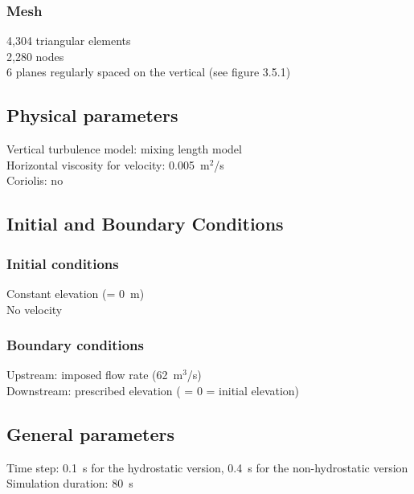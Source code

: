 \subsubsection{Mesh}
%
4,304 triangular elements\\
2,280 nodes\\
6 planes regularly spaced on the vertical (see figure 3.5.1)
%
%
%
\subsection{Physical parameters}
%
Vertical turbulence model: mixing length model\\
Horizontal viscosity for velocity: 0.005~m$^2$/s\\
Coriolis: no
%
%
%
%
%
%
\subsection{Initial and Boundary Conditions}
%
\subsubsection{Initial conditions}
%
Constant elevation (= 0~m)\\
No velocity
%
\subsubsection{Boundary conditions}
%
Upstream: imposed flow rate (62~m$^3$/s)\\
Downstream: prescribed elevation ( = 0 = initial elevation)
%
\subsection{General parameters}
%
Time step: 0.1~s for the hydrostatic version, 0.4~s for the
non-hydrostatic version\\
Simulation duration: 80~s
%
%
%
